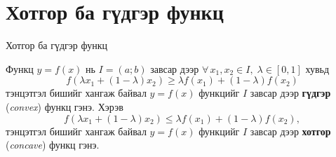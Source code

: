 

\section{Хотгор ба гүдгэр функц}
\begin{frame}[allowframebreaks]{Хотгор ба гүдгэр функц}
\begin{definition}
Функц $y=f(x)$ нь $I=(a;b)$ завсар дээр 
$ \forall\,x_1,x_2\in I,\; \lambda\in[0,1]$ хувьд 
\[
  f(\lambda x_1 + (1-\lambda)x_2)
  \geq \lambda f(x_1) + (1-\lambda)f(x_2) \] тэнцэтгэл бишийг хангаж байвал $y=f(x)$ функцийг $I$ завсар дээр 
  \textbf{гүдгэр} (\emph{convex}) функц гэнэ. Хэрэв 
  \[
  f(\lambda x_1 + (1-\lambda)x_2)
  \leq \lambda f(x_1) + (1-\lambda)f(x_2), 
  \] тэнцэтгэл бишийг хангаж байвал $y=f(x)$ функцийг $I$ завсар дээр 
  \textbf{хотгор} (\emph{concave}) функц гэнэ.
\end{definition}
\end{frame}

